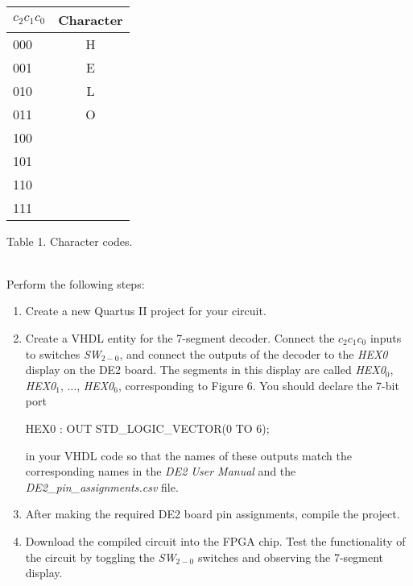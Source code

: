 \documentclass[psfig,10pt,fullpage]{article}
\begin{document}
~\\
\begin{center}
\begin{tabular}{l|c}
$c_2 c_1 c_0$ & Character \\ \hline
\hspace{0.75 mm} {\rule[0mm]{0mm}{5mm}000} & H\\ 
\hspace{0.75 mm} 001 & E\\
\hspace{0.75 mm} 010 & L\\
\hspace{0.75 mm} 011 & O\\
\hspace{0.75 mm} 100 & \\
\hspace{0.75 mm} 101 & \\
\hspace{0.75 mm} 110 & \\
\hspace{0.75 mm} 111 & \\
\end{tabular}
\end{center}

\begin{center}
Table 1. Character codes.
\end{center}

~\\
Perform the following steps:

\begin{enumerate}
\item Create a new Quartus II project for your circuit.
\item Create a VHDL entity for the 7-segment decoder. Connect the $c_2 c_1 c_0$ inputs
to switches {\it SW}$_{2-0}$, and connect the outputs of the decoder to the {\it HEX0} 
display on the DE2 board. The segments in this display are called 
{\it HEX0}$_0$, {\it HEX0}$_1$, $\ldots$, {\it HEX0}$_6$, corresponding to Figure 6.
You should declare the 7-bit port 

\begin{center}
\begin{minipage}[t]{12.5 cm}
\begin{tabbing}
HEX0 : OUT STD\_LOGIC\_VECTOR(0 TO 6);
\end{tabbing}
\end{minipage}
\end{center}

in your VHDL code so that the
names of these outputs match the corresponding names in the {\it DE2 User Manual} and the 
{\it DE2\_pin\_assignments.csv} file.
\item After making the required DE2 board pin assignments, compile the project.
\item Download the compiled circuit into the FPGA chip. Test the functionality of the 
circuit by toggling the {\it SW}$_{2-0}$ switches and observing the 7-segment display.
\end{enumerate}
\end{document}
